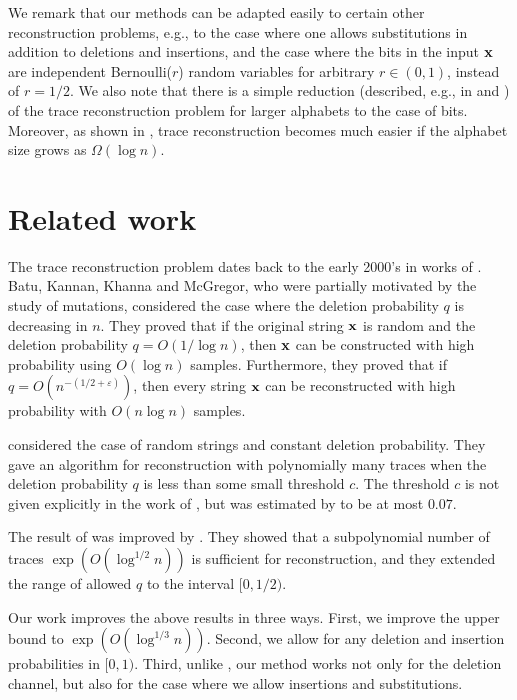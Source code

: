 \documentclass[final,12pt]{colt2018} %
\newcommand{\eps}{\varepsilon}
\newcommand{\1}{\mathbf{1}}
\def\x{{\bf x}}
\begin{document}
 
We remark that our methods can be adapted easily to certain other
reconstruction problems, e.g., to the case where one allows substitutions
in addition to deletions and insertions, and the case where the bits
in the input $\x$ are independent Bernoulli($r$) random variables for arbitrary
$r\in(0,1)$, instead of $r=1/2$. We also note that there is a simple reduction (described, e.g., in \cite{MPV14} and \cite{DOS16})  of the trace reconstruction problem for larger alphabets to the case of bits. Moreover, as shown in \cite{MPV14},   trace reconstruction  becomes much easier if the alphabet size grows as $\Omega(\log n)$.


\section{Related work}

The trace reconstruction problem dates back to the early 2000's in works of \citet*{L01a,L01b,BKKM04}. Batu, Kannan, Khanna and McGregor, who were partially motivated by the study of mutations, considered the case where the deletion probability $q$ is decreasing in $n$. They proved that if the original string $\x$ is random and the deletion probability $q=O(1/\log n)$, then $\x$ can be constructed with high probability using $O(\log n)$ samples. Furthermore, they proved that if $q=O(n^{-(1/2+\eps)})$, then every string $\x$ can be reconstructed with high probability with $O(n\log n)$ samples.

\citet*{HMPW08} considered the case of random strings and constant deletion probability. They gave an algorithm for reconstruction with polynomially many traces when the deletion probability $q$ is less than some small threshold $c$. The threshold $c$ is not given explicitly in the work of \citet*{HMPW08}, but was estimated by \cite{PZ17} to be at most $0.07$.

The result of \cite{HMPW08} was improved by \cite{PZ17}. They showed that a subpolynomial number of traces $\exp(O(\log^{1/2} n))$ is sufficient for reconstruction, and they extended the range of allowed $q$ to the interval $[0,1/2)$. %

Our work improves the above results in three ways. First, we improve the upper bound to  $\exp(O(\log^{1/3} n))$. Second, we allow for any deletion and insertion probabilities in $[0,1)$. Third, unlike \cite{PZ17}, our method works not only for the deletion channel, but also for the case where we allow insertions and substitutions.
\end{document}

